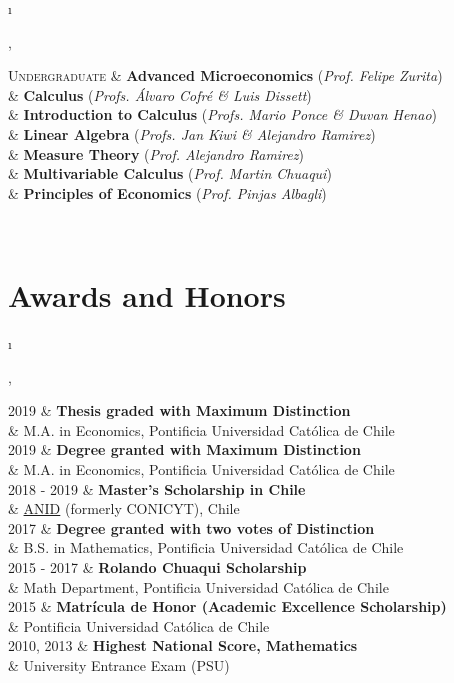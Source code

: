 \documentclass[a4paper, 10pt]{article}
\newcommand{\tablength}{}
\newcommand{\setTabParams}[1]{\renewcommand\tablength{}\forcsvlist{\listadd\tablength}{#1}}
\newcommand{\setCols}[1]{			%
	\ifnum0=\i						%
		\ifdim0cm=#1				%
			\def \firstCol {r}		%
		\else						%
			\def \firstCol {p{#1}}	%
		\fi							%
	\else \ifnum1=\i				%
		\ifdim0cm=#1				%
			\def \secondCol {l}		%
		\else						%
			\def \secondCol{p{#1}}	%
		\fi							%
	\else \ifnum2=\i				%
		\ifnum0=#1					%
			\def \sep {}			%
		\else						%
			\def \sep {|}			%
		\fi							%
	\fi \fi \fi						%
	\advance\i by1					%
}
\newcommand{\tab}[1]{							%
	\newcount\i									%
	\forlistloop{\setCols}{\tablength}			%
	\begin{tabular}{\firstCol \sep \secondCol}	%
		#1										%
	\end{tabular} \\[.5ex]						%
}
\begin{document}
\tab{
\textsc{Undergraduate} 
	&	\textbf{Advanced Microeconomics} (\emph{Prof. Felipe Zurita})							\\[0.4ex]
	&	\textbf{Calculus} (\emph{Profs. Álvaro Cofré \& Luis Dissett})						\\[0.4ex]
	&	\textbf{Introduction to Calculus} (\emph{Profs. Mario Ponce \& Duvan Henao})			\\[0.4ex]
	&	\textbf{Linear Algebra} (\emph{Profs. Jan Kiwi \& Alejandro Ramirez})	\\[0.4ex]
	&	\textbf{Measure Theory} (\emph{Prof. Alejandro Ramirez})								\\[0.4ex]
	&	\textbf{Multivariable Calculus} (\emph{Prof. Martin Chuaqui})							\\[0.4ex]
	&	\textbf{Principles of Economics} (\emph{Prof. Pinjas Albagli})							\\[0.4ex]
}

\section{Awards and Honors}
\setTabParams{0cm,11cm,0}

\tab{
\textsc{2019}
	&	\textbf{Thesis graded with Maximum Distinction}				\\[0.2ex]
	&	M.A. in Economics, Pontificia Universidad Católica de Chile		\\[2ex]

\textsc{2019}
	&	\textbf{Degree granted with Maximum Distinction}			\\[0.2ex]
	&	M.A. in Economics, Pontificia Universidad Católica de Chile		\\[2ex]

\textsc{2018 - 2019} 
	&	\textbf{Master's Scholarship in Chile}						\\[0.2ex]
	&	\href{https://www.anid.cl}{ANID} (formerly CONICYT), Chile		\\[2ex]
	
\textsc{2017}
	&	\textbf{Degree granted with two votes of Distinction}			\\[0.2ex]
	&	B.S. in Mathematics, Pontificia Universidad Católica de Chile	\\[2ex]

\textsc{2015 - 2017} 
	&	\textbf{Rolando Chuaqui Scholarship}						\\[0.2ex]
	&	Math Department, Pontificia Universidad Católica de Chile		\\[2ex]
	
\textsc{2015}
	&	\textbf{Matrícula de Honor (Academic Excellence Scholarship)}	\\[0.2ex]
	&	Pontificia Universidad Católica de Chile						\\[2ex]

\textsc{2010, 2013}
	&	\textbf{Highest National Score, Mathematics}				\\[0.2ex]
	&	 University Entrance Exam (PSU)							\\	
}
\end{document}
